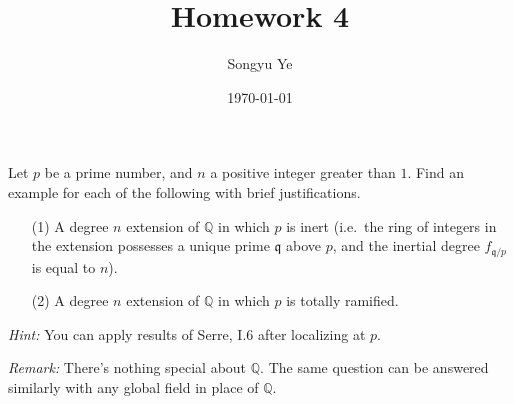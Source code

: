 \documentclass[12pt]{article}  %
\title{Homework 4}
\author{Songyu Ye}
\date{\today}
\begin{document}
\psettitle

\begin{problem}[Problem 1]
Let $p$ be a prime number, and $n$ a positive integer greater than $1$. Find an example for each of the following with brief justifications.
\begin{enumerate}
    \item[(1)] A degree $n$ extension of $\mathbb{Q}$ in which $p$ is inert (i.e.\ the ring of integers in the extension possesses a unique prime $\mathfrak{q}$ above $p$, and the inertial degree $f_{\mathfrak{q}/p}$ is equal to $n$).
    \item[(2)] A degree $n$ extension of $\mathbb{Q}$ in which $p$ is totally ramified.
\end{enumerate}
\textit{Hint:} You can apply results of Serre, I.6 after localizing at $p$.

\textit{Remark:} There’s nothing special about $\mathbb{Q}$. The same question can be answered similarly with any global field in place of $\mathbb{Q}$.
\end{problem}
\end{document}
